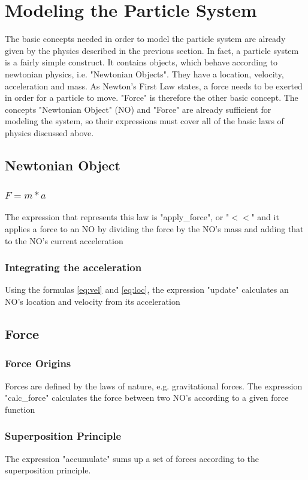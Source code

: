 \documentclass[runningheads,a4paper]{llncs}
\begin{document}
\section{Modeling the Particle System}
The basic concepts needed in order to model the particle system are already given by the physics described in the previous section. In fact, a particle system is a fairly simple construct. It contains objects, which behave according to newtonian physics, i.e. "Newtonian Objects". They have a location, velocity, acceleration and mass. As Newton's First Law states, a force needs to be exerted in order for a particle to move. "Force" is therefore the other basic concept.
The concepts "Newtonian Object" (NO) and "Force" are already sufficient for modeling the system, so their expressions must cover all of the basic laws of physics discussed above.

\subsection{Newtonian Object}

\subsubsection{$F = m*a$}
The expression that represents this law is "apply\_force", or "$<<$" and it applies a force to an NO by dividing the force by the NO's mass and adding that to the NO's current acceleration

\subsubsection{Integrating the acceleration}
Using the formulas \ref{eq:vel} and \ref{eq:loc}, the expression "update" calculates an NO's location and velocity from its acceleration

\subsection{Force}

\subsubsection{Force Origins}
Forces are defined by the laws of nature, e.g. gravitational forces. The expression "calc\_force" calculates the force between two NO's according to a given force function

\subsubsection{Superposition Principle}
The expression "accumulate" sums up a set of forces according to the superposition principle.
\end{document}
